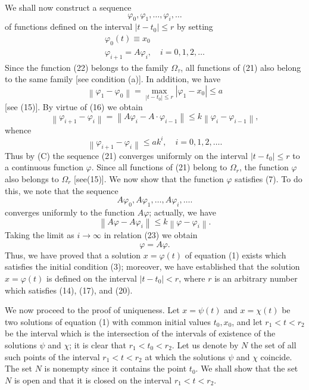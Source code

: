\documentclass[10pt,a5paper]{book}
\makeatletter
\theoremstyle{plain}
\theoremstyle{definition}
\theoremstyle{remark}
\renewenvironment{proof}[1][\proofname]{\par
  \pushQED{\qed}%
  \normalfont\topsep6\p@\@plus6\p@\relax
  \trivlist
  \item\relax{\itshape #1\@addpunct{.}}\hspace\labelsep\ignorespaces
}{\popQED\endtrivlist\@endpefalse}
\makeatother
\begin{document}
\begin{proof}[Proof of Theorem 1]
We shall now construct a sequence
\begin{equation*}
\varphi_{0}, \varphi_{1}, \ldots, \varphi_{i}, \ldots \tag{21}
\end{equation*}
of functions defined on the interval $\left|t-t_{0}\right| \leq r$ by setting
\begin{gather*}
\varphi_{0}(t) \equiv x_{0}  \tag{22}\\
\varphi_{i+1}=A \varphi_{i}, \quad i=0,1,2, \ldots \tag{23}
\end{gather*}
Since the function (22) belongs to the family $\Omega_{\tau}$, all functions of (21) also belong to the same family [see condition (a)]. In addition, we have
\[
\left\|\varphi_{1}-\varphi_{0}\right\|=\max _{\left|t-t_{0}\right| \leq r}\left|\varphi_{1}-x_{0}\right| \leq a
\]
[see (15)]. By virtue of (16) we obtain
\[
\left\|\varphi_{i+1}-\varphi_{i}\right\|=\left\|A \varphi_{i}-A \cdot \varphi_{i-1}\right\| \leq k\left\|\varphi_{i}-\varphi_{i-1}\right\|,
\]
whence
\[
\left\|\varphi_{i+1}-\varphi_{i}\right\| \leq a k^{i}, \quad i=0,1,2, \ldots .
\]
Thus by (C) the sequence (21) converges uniformly on the interval $\left|t-t_{0}\right| \leq r$ to a continuous function $\varphi$. Since all functions of (21) belong to $\Omega_{r}$, the function $\varphi$ also belongs to $\Omega_{r}$ [see(15)]. We now show that
the function $\varphi$ satisfies (7). To do this, we note that the sequence
\[
A \varphi_{0}, A \varphi_{1}, \ldots, A \varphi_{i}, \ldots .
\]
converges uniformly to the function $A \varphi$; actually, we have
\[
\left\|A \varphi-A \varphi_{i}\right\| \leq k\left\|\varphi-\varphi_{i}\right\| .
\]
Taking the limit as $i \rightarrow \infty$ in relation (23) we obtain
\[
\varphi=A \varphi .
\]
Thus, we have proved that a solution $x=\varphi(t)$ of equation (1) exists which satisfies the initial condition (3); moreover, we have established that the solution $x=\varphi(t)$ is defined on the interval $\left|t-t_{0}\right|<r$, where $r$ is an arbitrary number which satisfies (14), (17), and (20).

We now proceed to the proof of uniqueness. Let $x=\psi(t)$ and $x=\chi(t)$ be two solutions of equation (1) with common initial values $t_{0}, x_{0}$, and let $r_{1}<t<r_{2}$ be the interval which is the intersection of the intervals of existence of the solutions $\psi$ and $\chi$; it is clear that $r_{1}<t_{0}<r_{2}$. Let us denote by $N$ the set of all such points of the interval $r_{1}<t<r_{2}$ at which the solutions $\psi$ and $\chi$ coincide. The set $N$ is nonempty since it contains the point $t_{0}$. We shall show that the set $N$ is open and that it is closed on the interval $r_{1}<t<r_{2}$.


\end{proof}
\end{document}
